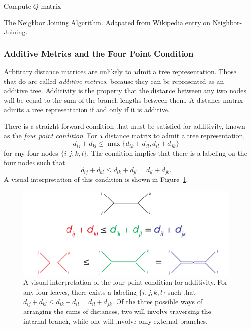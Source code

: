 \begin{algorithm}
     {
        Compute $Q$ matrix\;
    }
    \caption{The Neighbor Joining Algorithm. Adapated from Wikipedia entry on Neighbor-Joining.}
    \label{bg:alg:nj}
\end{algorithm}

\subsubsection{Additive Metrics and the Four Point Condition}

Arbitrary distance matrices are unlikely to admit a tree representation.
Those that do are called \emph{additive metrics}, because they can be represented as an additive tree.
Additivity is the property that the distance between any two nodes will be equal to the sum of the branch lengths between them.
A distance matrix admits a tree representation if and only if it is additive.

There is a straight-forward condition that must be satisfied for additivity, known as the \emph{four point condition}.
For a distance matrix to admit a tree representation, 
\begin{equation}
d_{ij} + d_{kl} \leq \max\{d_{ik} + d_{jl} ,  d_{il} + d_{jk} \}
\end{equation}
for any four nodes $\{i,j,k,l\}$.
The condition implies that there is a labeling on the four nodes such that
\begin{equation}
d_{ij} + d_{kl} \leq d_{ik} + d_{jl} =  d_{il} + d_{jk}.
\end{equation}
A visual interpretation of this condition is shown in Figure~\ref{background:fig:four_point_condition}.

\begin{figure}
\centering
\includegraphics[]{./fig/background/four_point_condition.pdf}
\caption[The four point condition for additivity]{A visual interpretation of the four point condition for additivity. For any four leaves, there exists a labeling $\{i,j,k,l\}$ such that $d_{ij}+d_{kl}\leq d_{ik}+d_{il} = d_{il}+d_{jk}$. Of the three possible ways of arranging the sums of distances, two will involve traversing the internal branch, while one will involve only external branches.}
\label{background:fig:four_point_condition}
\end{figure}

